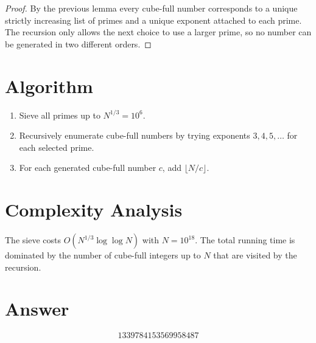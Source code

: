 \documentclass[11pt]{article}
\begin{document}
\begin{proof}
By the previous lemma every cube-full number corresponds to a unique strictly increasing list of primes and a unique exponent attached to each prime. The recursion only allows the next choice to use a larger prime, so no number can be generated in two different orders.
\end{proof}

\section{Algorithm}

\begin{enumerate}
  \item Sieve all primes up to $N^{1/3} = 10^6$.
  \item Recursively enumerate cube-full numbers by trying exponents $3,4,5,\dots$ for each selected prime.
  \item For each generated cube-full number $c$, add $\lfloor N/c \rfloor$.
\end{enumerate}

\section{Complexity Analysis}

The sieve costs $O(N^{1/3}\log\log N)$ with $N=10^{18}$. The total running time is dominated by the number of cube-full integers up to $N$ that are visited by the recursion.

\section{Answer}

\[
\boxed{1339784153569958487}
\]
\end{document}
